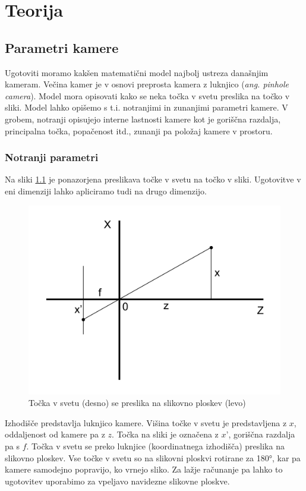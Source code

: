 \documentclass[a4paper, 12pt]{book}
\begin{document}
\chapter{Teorija}
\section{Parametri kamere}
Ugotoviti moramo kakšen matematični model najbolj ustreza današnjim kameram. Večina kamer je v osnovi preprosta kamera z luknjico (\emph{ang. pinhole camera}). Model mora opisovati kako se neka točka v svetu preslika na točko v sliki. Model lahko opišemo s t.i. notranjimi in zunanjimi parametri kamere. V grobem, notranji opisujejo interne lastnosti kamere kot je goriščna razdalja, principalna točka, popačenost itd., zunanji pa položaj kamere v prostoru.

\subsection{Notranji parametri}
Na sliki \ref{similar1} je ponazorjena preslikava točke v svetu na točko v sliki. Ugotovitve v eni dimenziji lahko apliciramo tudi na drugo dimenzijo. 

\begin{figure}[H]
\centering
\includegraphics[width=\textwidth,height=\textheight,keepaspectratio]{similar_triangles_1.png}
\caption{Točka v svetu (desno) se preslika na slikovno ploskev (levo)}
\label{similar1}
\end{figure}

Izhodišče predstavlja luknjico kamere. Višina točke v svetu je predstavljena z $x$, oddaljenost od kamere pa z $z$. Točka na sliki je označena z $x’$, goriščna razdalja pa s $f$. Točka v svetu se preko luknjice (koordinatnega izhodišča) preslika na slikovno ploskev. Vse točke v svetu so na slikovni ploskvi rotirane za 180°, kar pa kamere samodejno popravijo, ko vrnejo sliko. Za lažje računanje pa lahko to ugotovitev uporabimo za vpeljavo navidezne slikovne ploskve. 
\end{document}
